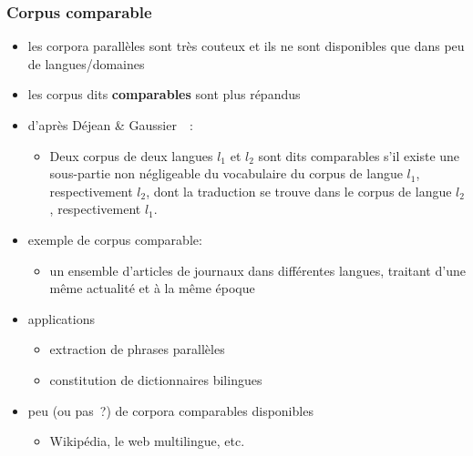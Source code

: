 \begin{frame}[allowframebreaks]
\frametitle{Corpus comparable}

\begin{itemize} \itemsep0.8em
    \item les corpora parallèles sont très couteux et ils ne sont
          disponibles que dans peu de langues/domaines
    \item les corpus dits \textbf{comparables} sont plus répandus
    \item d'après Déjean \& Gaussier~\cite{dejean2002nouvelle}~:
    \begin{itemize}
        \item \og{}Deux corpus de deux langues $l_1$ et $l_2$ sont dits 
              comparables s'il existe une sous-partie non négligeable du 
              vocabulaire du corpus de langue $l_1$, respectivement $l_2$, dont
              la traduction se trouve dans le corpus de langue $l_2$, 
              respectivement $l_1$.\fg{}
    \end{itemize}

    \framebreak

    \item exemple de corpus comparable:
    \begin{itemize}
        \item un ensemble d'articles de journaux dans différentes langues,
              traitant d'une même actualité et à la même époque
    \end{itemize}
    \item applications
    \begin{itemize}
        \item extraction de phrases parallèles~\cite{smith2010extracting}
        \item constitution de dictionnaires bilingues~\cite{rapp1999automatic}
    \end{itemize}
    \item peu (ou pas~?) de corpora comparables disponibles
    \begin{itemize}
        \item Wikipédia, le web multilingue, etc.
    \end{itemize}
\end{itemize}

\end{frame}


